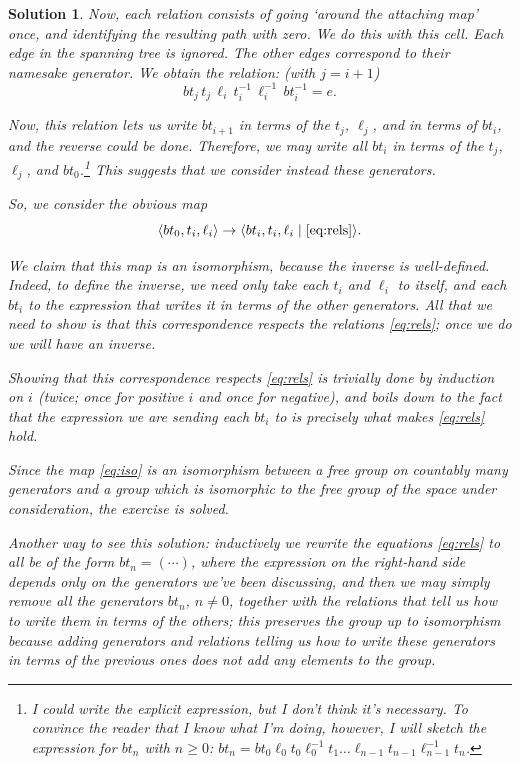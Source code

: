 \documentclass{article}
\theoremstyle{plain}
\theoremstyle{nonumberplain}
\newtheorem{sol}{Solution}
\DeclarePairedDelimiter{\braket}{\langle}{\rangle}
\begin{document}
\begin{sol}
Now, each relation consists of going `around the attaching map' once, and identifying the resulting path with zero. We do this with this cell. Each edge in the spanning tree is ignored. The other edges correspond to their namesake generator. We obtain the relation: (with $j = i+1$)
\begin{equation} \label{eq:rels}
bt_j \, t_j \, \ell_i \, t_i^{-1} \, \ell_i^{-1} \, bt_i^{-1} = e.
\end{equation}

Now, this relation lets us write $bt_{i+1}$ in terms of the $t_j$, $\ell_j$, and in terms of $bt_i$, and the reverse could be done. Therefore, \emph{we may write all $bt_i$ in terms of the $t_j$, $\ell_j$, and $bt_0$}.\footnote{I could write the explicit expression, but I don't think it's necessary. To convince the reader that I know what I'm doing, however, I will sketch the expression for $bt_n$ with $n \geq 0$: $bt_n = bt_0 \ell_0 t_0 \ell_0^{-1} t_1 \dots \ell_{n-1} t_{n-1} \ell_{n-1}^{-1} t_n$.} This suggests that we consider instead these generators.

So, we consider the obvious map
\begin{equation}\label{eq:iso}
\braket{bt_0, t_i, \ell_i} \to \braket{bt_i, t_i, \ell_i \mid \eqref{eq:rels}}.
\end{equation}

We claim that this map is an isomorphism, because the inverse is well-defined. Indeed, to define the inverse, we need only take each $t_i$ and $\ell_i$ to itself, and each $bt_i$ to the expression that writes it in terms of the other generators. All that we need to show is that this correspondence respects the relations \eqref{eq:rels}; once we do we will have an inverse.

Showing that this correspondence respects \eqref{eq:rels} is trivially done by induction on $i$ (twice; once for positive $i$ and once for negative), and boils down to the fact that the expression we are sending each $bt_i$ to is precisely what makes \eqref{eq:rels} hold.

Since the map \eqref{eq:iso} is an isomorphism between a free group on countably many generators and a group which is isomorphic to the free group of the space under consideration, the exercise is solved.

\smallskip

Another way to see this solution: inductively we rewrite the equations \eqref{eq:rels} to all be of the form $bt_n = (\cdots)$, where the expression on the right-hand side depends only on the generators we've been discussing, and then we may simply remove all the generators $bt_n$, $n \neq 0$, together with the relations that tell us how to write them in terms of the others; this preserves the group up to isomorphism because adding generators and relations telling us how to write these generators in terms of the previous ones does not add any elements to the group.
\end{sol}
\end{document}
